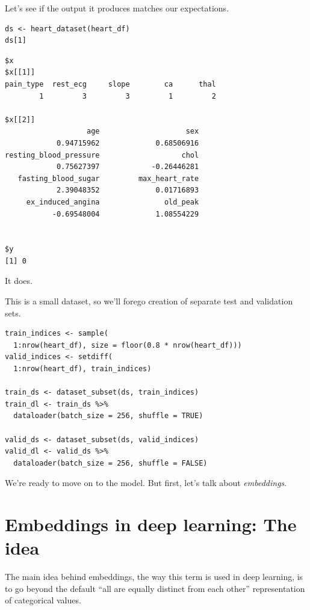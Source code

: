 \documentclass[
  letterpaper,
]{krantz}
\begin{document}
Let's see if the output it produces matches our expectations.

\begin{verbatim}
ds <- heart_dataset(heart_df)
ds[1]
\end{verbatim}

\begin{verbatim}
$x
$x[[1]]
pain_type  rest_ecg     slope        ca      thal 
        1         3         3         1         2 

$x[[2]]
                   age                    sex 
            0.94715962             0.68506916 
resting_blood_pressure                   chol 
            0.75627397            -0.26446281 
   fasting_blood_sugar         max_heart_rate 
            2.39048352             0.01716893 
     ex_induced_angina               old_peak 
           -0.69548004             1.08554229 


$y
[1] 0
\end{verbatim}

It does.

This is a small dataset, so we'll forego creation of separate test and
validation sets.

\begin{verbatim}
train_indices <- sample(
  1:nrow(heart_df), size = floor(0.8 * nrow(heart_df)))
valid_indices <- setdiff(
  1:nrow(heart_df), train_indices)

train_ds <- dataset_subset(ds, train_indices)
train_dl <- train_ds %>% 
  dataloader(batch_size = 256, shuffle = TRUE)

valid_ds <- dataset_subset(ds, valid_indices)
valid_dl <- valid_ds %>% 
  dataloader(batch_size = 256, shuffle = FALSE)
\end{verbatim}

We're ready to move on to the model. But first, let's talk about
\emph{embeddings}.

\hypertarget{embeddings-in-deep-learning-the-idea}{%
\section{\texorpdfstring{Embeddings in deep learning:
The
idea}{Embeddings in deep learning: The idea}}\label{embeddings-in-deep-learning-the-idea}}

The main idea behind embeddings, the way this term is used in deep
learning, is to go beyond the default ``all are equally distinct from
each other'' representation of categorical values.
\end{document}
